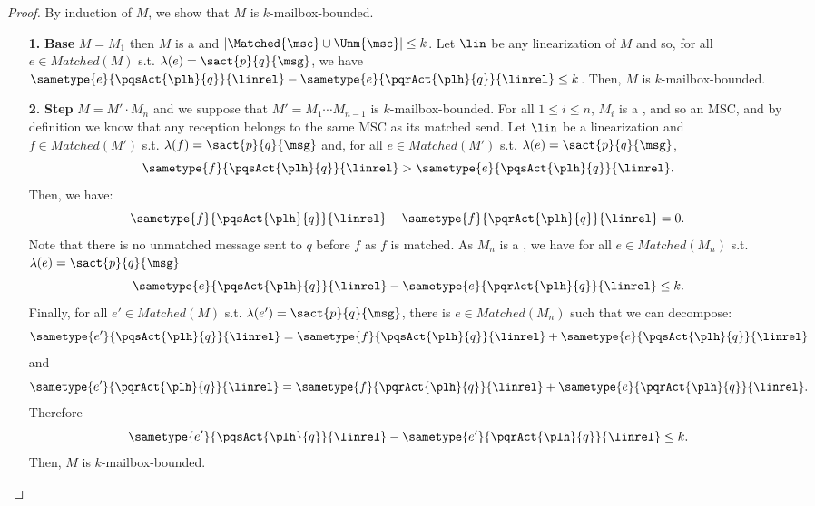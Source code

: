 \begin{proof}
	By induction of $M$, we show that $M$ is $k$-mailbox-bounded.
	\begin{itemize}
		\item[\textbf{1.}]\textbf{Base}
		$M = M_1$ then $M$ is a  and $|\Matched{\msc} \cup \Unm{\msc}| \le k$. Let $\lin$ be any linearization of $M$ and so, for all $e \in Matched(M)$ s.t. $\lambda(e) = \sact{p}{q}{\msg}$, we have
		$\sametype{e}{\pqsAct{\plh}{q}}{\linrel} - \sametype{e}{\pqrAct{\plh}{q}}{\linrel} \le k$. Then, $M$ is $k$-mailbox-bounded.
		\item[\textbf{2.}]\textbf{Step}
 $M = M' \cdot M_n$ and we suppose that $M' = M_1 \cdots M_{n-1}$ is $k$-mailbox-bounded.
		For all $1\leq i\leq {n}$, $M_i$ is a , and so an MSC, and by definition we know that any reception belongs to the same MSC as its matched send.
		Let $\lin$ be a linearization and $f \in Matched(M')$ s.t. $\lambda(f) = \sact{p}{q}{\msg}$ and, for all $e \in Matched(M')$ s.t. $\lambda(e) = \sact{p}{q}{\msg}$,
		\[\sametype{f}{\pqsAct{\plh}{q}}{\linrel} > \sametype{e}{\pqsAct{\plh}{q}}{\linrel}.\]
		Then, we have:
		\[\sametype{f}{\pqsAct{\plh}{q}}{\linrel} - \sametype{f}{\pqrAct{\plh}{q}}{\linrel} = 0.\]
		Note that there is no unmatched message sent to $q$ before $f$ as $f$ is matched.
		As $M_n$ is a , we have for all  $e \in Matched(M_n)$ s.t. $\lambda(e) = \sact{p}{q}{\msg}$
		\[\sametype{e}{\pqsAct{\plh}{q}}{\linrel} - \sametype{e}{\pqrAct{\plh}{q}}{\linrel} \le k.\]
		Finally, for all  $e' \in Matched(M)$ s.t. $\lambda(e') = \sact{p}{q}{\msg}$, there is $e \in Matched(M_n)$ such that we can decompose:
		\[\sametype{e'}{\pqsAct{\plh}{q}}{\linrel} = \sametype{f}{\pqsAct{\plh}{q}}{\linrel} + \sametype{e}{\pqsAct{\plh}{q}}{\linrel} \]
		and
		\[\sametype{e'}{\pqrAct{\plh}{q}}{\linrel} =  \sametype{f}{\pqrAct{\plh}{q}}{\linrel} + \sametype{e}{\pqrAct{\plh}{q}}{\linrel}.\]
		Therefore \[  \sametype{e'}{\pqsAct{\plh}{q}}{\linrel} - \sametype{e'}{\pqrAct{\plh}{q}}{\linrel} \le k.\]
		Then, $M$ is $k$-mailbox-bounded.
	\end{itemize}%
\end{proof}
